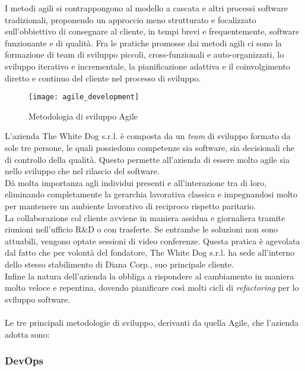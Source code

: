 I metodi agili si contrappongono al modello a cascata e altri processi software tradizionali, proponendo un approccio meno strutturato e focalizzato sull'obbiettivo di consegnare al cliente, in tempi brevi e frequentemente, software funzionante e di qualità. Fra le pratiche promosse dai metodi agili ci sono la formazione di team di sviluppo piccoli, cross-funzionali e auto-organizzati, lo sviluppo iterativo e incrementale, la pianificazione adattiva e il coinvolgimento diretto e continuo del cliente nel processo di sviluppo. 

\label{Metodologia Agile}
\begin{figure}[ht]
	\begin{center}
		\texttt{[image: agile\_development]}
		\caption{Metodologia di sviluppo Agile}
	\end{center}
\end{figure}
\FloatBarrier

L'azienda The White Dog s.r.l. è composta da un \textit{team} di sviluppo formato da sole tre persone, le quali possiedono competenze sia software, sia decisionali che di controllo della qualità. Questo permette all'azienda di essere molto agile sia nello sviluppo che nel rilascio del software. \\ 
Dà molta importanza agli individui presenti e all'interazione tra di loro, eliminando completamente la gerarchia lavorativa classica e impegnandosi molto per mantenere un ambiente lavorativo di reciproco rispetto paritario. \\
La collaborazione col cliente avviene in maniera assidua e giornaliera tramite riunioni nell'ufficio R\&D o con trasferte. Se entrambe le soluzioni non sono attuabili, vengono optate sessioni di video conferenze. Questa pratica è agevolata dal fatto che per volontà del fondatore, The White Dog s.r.l. ha sede all'interno dello stesso stabilimento di Diana Corp., suo principale cliente. \\
Infine la natura dell'azienda la obbliga a rispondere al cambiamento in maniera molto veloce e repentina, dovendo pianificare così molti cicli di \textit{refactoring} per lo sviluppo software. \\ \\

Le tre principali metodologie di sviluppo, derivanti da quella Agile, che l'azienda adotta sono:

\subsubsection{DevOps}

